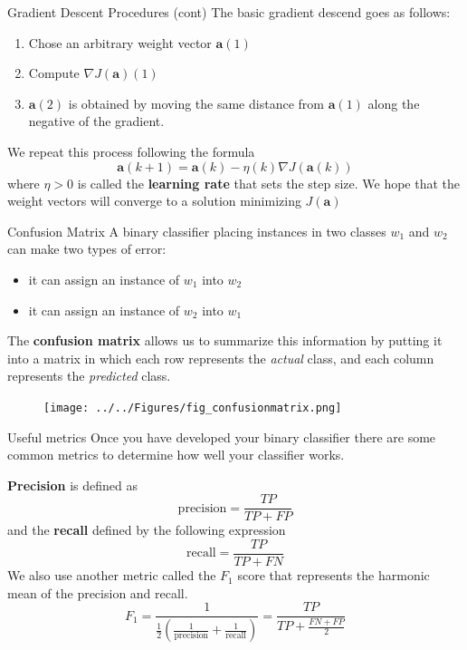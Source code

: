 \documentclass{beamer}
\begin{document}
\begin{frame}{Gradient Descent Procedures (cont)}	
	The basic gradient descend goes as follows:
	
	\begin{enumerate}
		\item Chose an arbitrary weight vector $\mathbf{a}(1)$ 
		\item Compute $\nabla J (\mathbf{a})(1)$
		\item $\mathbf{a}(2)$ is obtained by moving the same distance from $\mathbf{a}(1)$ along the negative of the gradient.
	\end{enumerate}
We repeat this process following the formula
\begin{equation*}
	\mathbf{a}(k+1)= \mathbf{a}(k) -\eta(k) \nabla J (\mathbf{a}(k))
\end{equation*}
where $\eta >0 $ is called the {\bf learning rate } that sets the step size. We hope that the weight vectors will converge to a solution minimizing $J(\mathbf{a})$
\end{frame}


\begin{frame}{Confusion Matrix}
	A binary classifier placing instances in two classes $w_1$ and $w_2$ can make two types of error:
	\begin{itemize}
		\item it can assign an instance of $w_1$ into $w_2$
		\item it can assign an instance of $w_2$ into $w_1$
	\end{itemize}
The {\bf confusion matrix} allows us to summarize this information by putting it into a matrix in which each row represents the {\it actual} class, and each column represents the {\it predicted} class.

\begin{figure}
	\centering
	\texttt{[image: ../../Figures/fig\_confusionmatrix.png]}
\end{figure}

\end{frame}



\begin{frame}{Useful metrics}
	Once you have developed your binary classifier there are some common metrics to determine how well your classifier works.
	
	{\bf Precision} is defined as
	\begin{equation*}
		\textrm{precision}= \frac{TP}{TP+FP}
	\end{equation*}
	and the {\bf recall}  defined by the following expression
	\begin{equation*}
		\textrm{recall}= \frac{TP}{TP+FN}
	\end{equation*}
We also use another metric called the $F_1$ score that represents the harmonic mean of the precision and recall. 
\begin{equation*}
F_1= \frac{1}{\frac{1}{2}( \frac{1}{\textrm{precision}}+ \frac{1}{\textrm{recall}})}=\frac{TP}{TP+ \frac{FN+FP}{2}}
\end{equation*}
\end{frame}	
\end{document}
